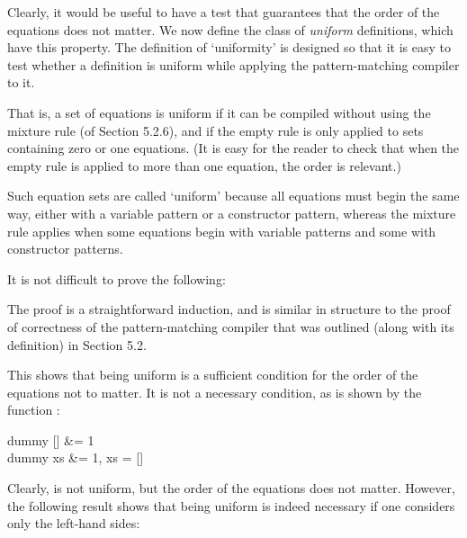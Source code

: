 Clearly, it would be useful to have a test that guarantees that the order of
the equations does not matter. We now define the class of \textit{uniform} definitions,
which have this property. The definition of `uniformity' is designed so that it is
easy to test whether a definition is uniform while applying the pattern-matching compiler to it.


That is, a set of equations is uniform if it can be compiled without using the
mixture rule (of Section 5.2.6), and if the empty rule is only applied to sets
containing zero or one equations. (It is easy for the reader to check that when
the empty rule is applied to more than one equation, the order is relevant.)

Such equation sets are called `uniform' because all equations must begin the
same way, either with a variable pattern or a constructor pattern, whereas the
mixture rule applies when some equations begin with variable patterns and
some with constructor patterns.

It is not difficult to prove the following:


The proof is a straightforward induction, and is similar in structure to the
proof of correctness of the pattern-matching compiler that was outlined
(along with its definition) in Section 5.2.

This shows that being uniform is a sufficient condition for the order of the
equations not to matter. It is not a necessary condition, as is shown by the
function :
\begin{letalign}
dummy [] &= 1\\
dummy xs &= 1, xs = []
\end{letalign}
Clearly,  is not uniform, but the order of the equations does not matter.
However, the following result shows that being uniform is indeed necessary if
one considers only the left-hand sides:

